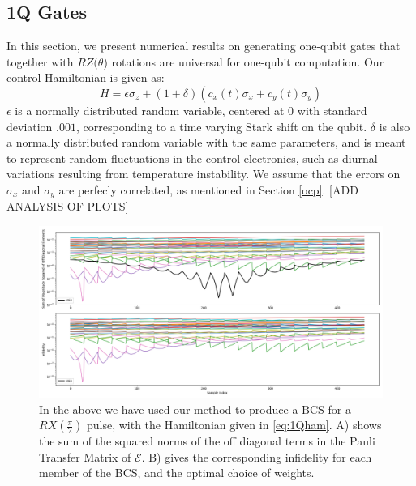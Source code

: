\documentclass[aps,nofootinbib,pra,notitlepage,twocolumn]{revtex4-1}
\begin{document}
\subsection{1Q Gates}\label{1Q Gates}
 In this section, we present numerical results on generating one-qubit gates that together with $RZ(\theta$) rotations are universal for one-qubit computation. Our control Hamiltonian is given as: 
\begin{equation}\label{eq:1Qham}
  H = \epsilon\sigma_z + (1 + \delta)(c_x(t)\sigma_x + c_y(t)\sigma_y)
\end{equation}
$\epsilon$ is a normally distributed random variable, centered at $0$ with standard deviation $.001$, corresponding to a time varying Stark shift on the qubit. $\delta$ is also a normally distributed random variable with the same parameters, and is meant to represent random fluctuations in the control electronics, such as diurnal variations resulting from temperature instability. We assume that the errors on $\sigma_x$ and $\sigma_y$ are perfecly correlated, as mentioned in Section \ref{ocp}.
[ADD ANALYSIS OF PLOTS]
\begin{figure}
\centering
\includegraphics[width=\textwidth]{x2.png}
\caption{In the above we have used our method to produce a BCS for a $RX(\frac{\pi}{2})$ pulse, with the Hamiltonian given in \ref{eq:1Qham}. A) shows the sum of the squared norms of the off diagonal terms in the Pauli Transfer Matrix of $\mathcal{E}$. B) gives the corresponding infidelity for each member of the BCS, and the optimal choice of weights.}
\end{figure}
\end{document}
